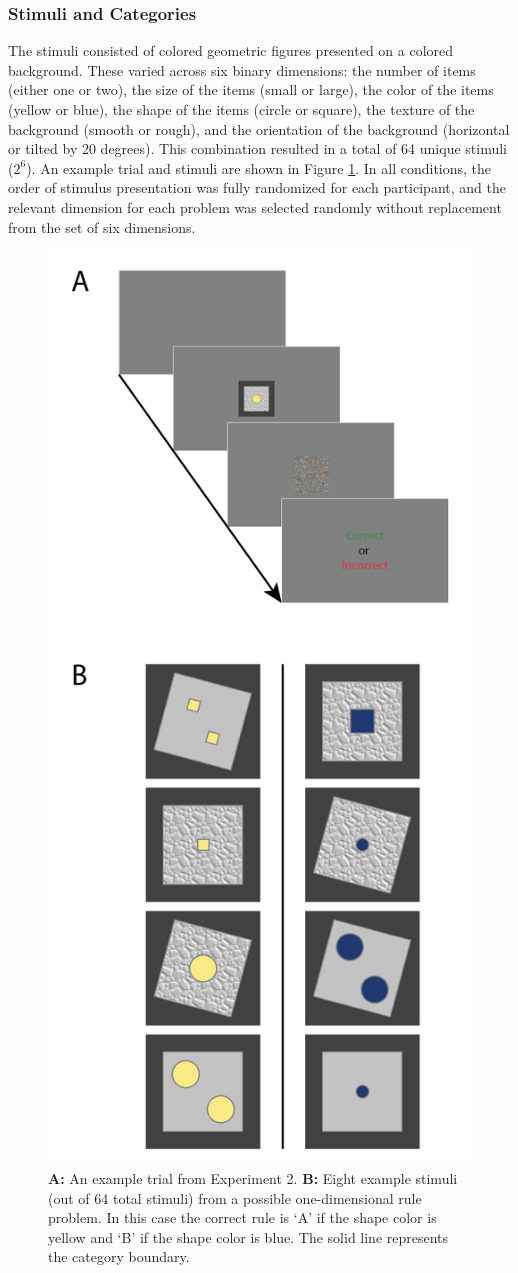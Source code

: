 \documentclass[doc, floatsintext]{apa7}
\begin{document}
\subsubsection{Stimuli and Categories}
The stimuli consisted of colored geometric figures presented
on a colored background. These varied across six binary
dimensions: the number of items (either one or two), the
size of the items (small or large), the color of the items
(yellow or blue), the shape of the items (circle or square),
the texture of the background (smooth or rough), and the
orientation of the background (horizontal or tilted by 20
degrees). This combination resulted in a total of 64 unique
stimuli ($2^6$). An example trial and stimuli are shown in
Figure \ref{fig_design_exp_2}. In all conditions, the order
of stimulus presentation was fully randomized for each
participant, and the relevant dimension for each problem was
selected randomly without replacement from the set of six
dimensions.

\begin{figure}
  \centering
  \includegraphics[width=.5\textwidth]{../figures/fig_design_exp_2.png}
  \caption{
      \textbf{A:} An example trial from Experiment 2.
      \textbf{B:} Eight example stimuli (out of 64 total
      stimuli) from a possible one-dimensional rule problem.
      In this case the correct rule is `A' if the shape
      color is yellow and `B' if the shape color is blue.
      The solid line represents the category boundary.
}
  \label{fig_design_exp_2}
\end{figure}
\end{document}
